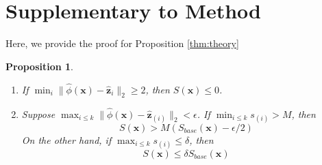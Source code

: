 \documentclass[10pt,twocolumn,letterpaper]{article}
\newtheorem{prop}[thm]{Proposition}
\begin{document}
{\small


}



\clearpage

\appendix

\onecolumn

\setcounter{thm}{0}

\section{Supplementary to Method}

Here, we provide the proof for Proposition \ref{thm:theory}

\begin{prop}
$\quad$
\begin{enumerate}
\item[(a)] If $\min_i \lVert \widehat{\phi}(\mathbf{x}) - \widehat{\mathbf{z}}_i\rVert_2 \geq 2$, then $S(\mathbf{x}) \leq 0$.
\item[(b)] Suppose $\max_{i \leq k} \lVert \widehat{\phi}(\mathbf{x}) - \widehat{\mathbf{z}}_{(i)}\rVert_2 < \epsilon$. 
If $\min_{i \leq k} s_{(i)} > M$, then
\begin{equation}
\label{eq:near_high_conf}
S(\mathbf{x}) > M (S_{base}(\mathbf{x}) - \epsilon/2)
\end{equation}
On the other hand, if $\max_{i \leq k} s_{(i)} \leq \delta$, then
\begin{equation}
\label{eq:near_low_conf}
S(\mathbf{x}) \leq \delta  S_{base}(\mathbf{x})
\end{equation}
\end{enumerate}
\end{prop}
\end{document}
